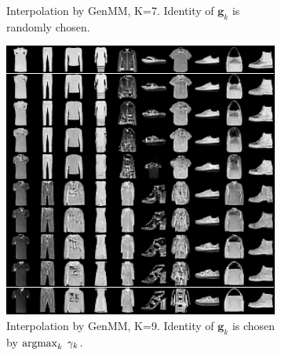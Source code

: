 \begin{figure}[!ht]
\begin{subfigure}[b]{0.3\textwidth}
    \caption{Interpolation by GenMM, K=7. Identity of $\bm{g}_k$ is randomly chosen.}\label{fig-interpo-genmm2}
  \end{subfigure}
  \hspace{10pt}
  \begin{subfigure}[b]{0.3\textwidth}
    \centering
    \includegraphics[width=1\linewidth]{images/fashion-mnist/interpolation/interpoFashion_homo_GenMM_K9_map_grid.png}
    \caption{Interpolation by GenMM, K=9. Identity of $\bm{g}_k$ is chosen by $\operatorname{argmax}_{k}\; \gamma_k$.}\label{fig-interpo-genmm3}
  \end{subfigure}
  \vspace{0.22cm}
  \centering
  \captionsetup[subfigure]{justification=centering}
  \begin{subfigure}[b]{0.3\textwidth}
    \centering

\end{subfigure}
\end{figure}
